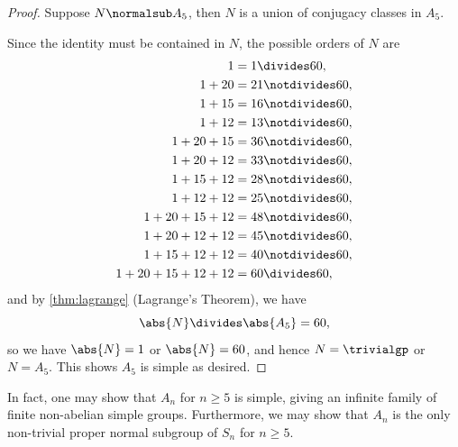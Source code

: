 \begin{proof}
    Suppose \(N \normalsub A_5\), then \(N\) is a union of conjugacy classes in \(A_5\).

    Since the identity must be contained in \(N\), the possible orders of \(N\) are
    \begin{align*}
        1 &= 1 \divides 60, \\
        1 + 20 &= 21 \notdivides 60, \\
        1 + 15 &= 16 \notdivides 60, \\
        1 + 12 &= 13 \notdivides 60, \\
        1 + 20 + 15 &= 36 \notdivides 60, \\
        1 + 20 + 12 &= 33 \notdivides 60, \\
        1 + 15 + 12 &= 28 \notdivides 60, \\
        1 + 12 + 12 &= 25 \notdivides 60, \\
        1 + 20 + 15 + 12 &= 48 \notdivides 60, \\
        1 + 20 + 12 + 12 &= 45 \notdivides 60, \\
        1 + 15 + 12 + 12 &= 40 \notdivides 60, \\
        1 + 20 + 15 + 12 + 12 &= 60 \divides 60,
    \end{align*}
    and by \autoref{thm:lagrange} (Lagrange's Theorem), we have
    \[
        \abs{N} \divides \abs{A_5} = 60,
    \]
    so we have \(\abs{N} = 1\) or \(\abs{N} = 60\), and hence \(N = \trivialgp\) or \(N = A_5\). This shows \(A_5\) is simple as desired.
\end{proof}

In fact, one may show that \(A_n\) for \(n \geq 5\) is simple, giving an infinite family of finite non-abelian simple groups. Furthermore, we may show that \(A_n\) is the only non-trivial proper normal subgroup of \(S_n\) for \(n \geq 5\).